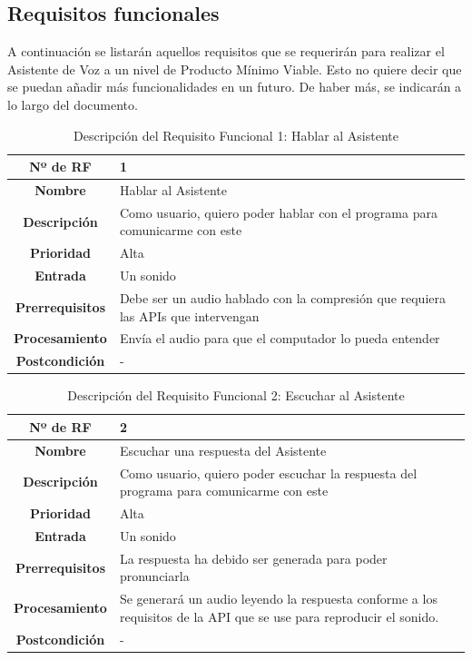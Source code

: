 \subsection{Requisitos funcionales}
A continuación se listarán aquellos requisitos que se requerirán para realizar el Asistente de Voz a un nivel de Producto Mínimo Viable. Esto no quiere decir que se puedan añadir más funcionalidades en un futuro. De haber más, se indicarán a lo largo del documento.

\begin{table}[H]
	\centering
	\begin{tabularx}{\textwidth}{|c|X|} 
		\hline
		\textbf{Nº de RF }          &  1 \\ 
		\hline
		\textbf{Nombre}         &  Hablar al Asistente \\ 
		\hline
		\textbf{Descripción}    &  Como usuario, quiero poder hablar con el programa para comunicarme con este \\ 
		\hline
		\textbf{Prioridad}      &  Alta  \\ 
		\hline
		\textbf{Entrada}        & Un sonido  \\ 
		\hline
		\textbf{Prerrequisitos} & Debe ser un audio hablado con la compresión que requiera las APIs que intervengan  \\ 
		\hline
		\textbf{Procesamiento}  &  Envía el audio para que el computador lo pueda entender \\ 
		\hline
		\textbf{Postcondición}  &  - \\
		\hline
	\end{tabularx}
	\caption{Descripción del Requisito Funcional 1: Hablar al Asistente}
\end{table}

\begin{table}[H]
	\centering
	\begin{tabularx}{\textwidth}{|c|X|} 
		\hline
		\textbf{Nº de RF }          &  2 \\ 
		\hline
		\textbf{Nombre}         &  Escuchar una respuesta del Asistente \\ 
		\hline
		\textbf{Descripción}    &  Como usuario, quiero poder escuchar la respuesta del programa para comunicarme con este \\ 
		\hline
		\textbf{Prioridad}      &  Alta  \\ 
		\hline
		\textbf{Entrada}        & Un sonido  \\ 
		\hline
		\textbf{Prerrequisitos} & La respuesta ha debido ser generada para poder pronunciarla \\ 
		\hline
		\textbf{Procesamiento}  &  Se generará un audio leyendo la respuesta conforme a los requisitos de la API que se use para reproducir el sonido. \\ 
		\hline
		\textbf{Postcondición}  &  - \\
		\hline
	\end{tabularx}
	\caption{Descripción del Requisito Funcional 2: Escuchar al Asistente}
\end{table}

